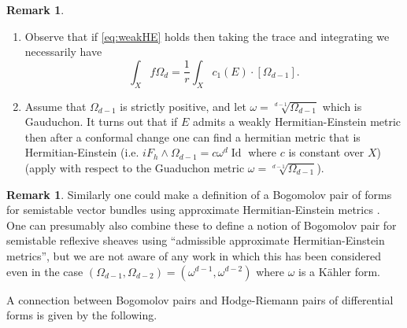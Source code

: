 \documentclass[a4,reqno]{amsart}
\theoremstyle{definition}
\newtheorem{remark}[theorem]{Remark}
\DeclareMathOperator{\Id}{Id}
\numberwithin{equation}{section}
\begin{document}
\begin{remark}
\begin{enumerate}
\item Observe that if \eqref{eq:weakHE} holds then taking the trace and integrating we necessarily have
$$\int_X f\Omega_d = \frac{1}{r} \int_X c_1(E)\cdot [\Omega_{d-1}].$$
\item Assume that $\Omega_{d-1}$ is strictly  positive, and let $\omega = \sqrt[d-1]{\Omega_{d-1}}$ which is Gauduchon.    It turns out that if $E$ admits a weakly Hermitian-Einstein metric then after a conformal change one can find a hermitian metric that is Hermitian-Einstein (i.e. $iF_h\wedge \Omega_{d-1} = c\omega^d \Id$ where $c$ is constant over $X$) (apply \cite[2.1.5]{LuTe} with respect to the Guaduchon metric $\omega = \sqrt[d-1]{\Omega_{d-1}}$). 
\end{enumerate}
\end{remark}

\begin{remark}
Similarly one could make a definition of a Bogomolov pair of forms for semistable vector bundles using approximate Hermitian-Einstein metrics \cite[Chapter 6]{KobayashiVectorBundles}.  One can presumably also combine these to define a notion of Bogomolov pair for semistable reflexive sheaves using ``admissible approximate Hermitian-Einstein metrics'', but we are not aware of any work in which this has been considered even in the case $(\Omega_{d-1},\Omega_{d-2}) = (\omega^{d-1},\omega^{d-2})$ where $\omega$ is a K\"ahler form.
\end{remark}


A connection between Bogomolov pairs and Hodge-Riemann pairs of differential \textit{}forms is given by the following.
\end{document}
